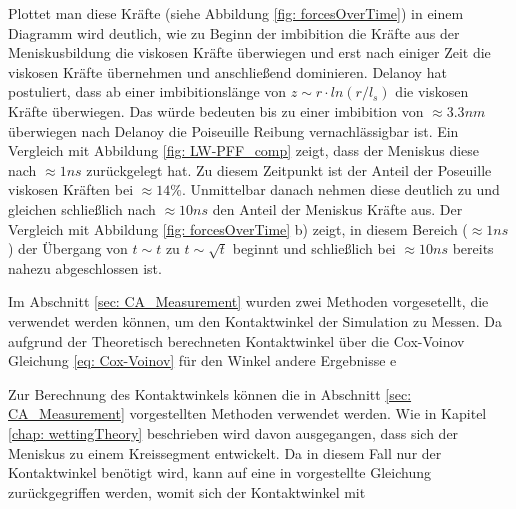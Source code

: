 Plottet man diese Kräfte (siehe  Abbildung \ref*{fig: forcesOverTime}) in einem Diagramm wird deutlich, wie zu Beginn der imbibition die Kräfte aus der Meniskusbildung die viskosen Kräfte überwiegen und erst nach einiger Zeit die viskosen Kräfte übernehmen und anschließend dominieren. Delanoy hat postuliert, dass ab einer imbibitionslänge von $z \sim r\cdot ln(r/l_s)$ die viskosen Kräfte überwiegen. Das würde bedeuten bis zu einer imbibition von $\approx 3.3nm$ überwiegen nach Delanoy die Poiseuille Reibung vernachlässigbar ist. Ein Vergleich mit Abbildung \ref*{fig: LW-PFF_comp} zeigt, dass der Meniskus diese nach $\approx 1ns$ zurückgelegt hat. Zu diesem Zeitpunkt ist der Anteil der Poseuille viskosen Kräften bei $\approx 14\%$. Unmittelbar danach nehmen diese deutlich zu und gleichen schließlich nach $\approx 10ns$ den Anteil der Meniskus Kräfte aus. Der Vergleich mit Abbildung \ref*{fig: forcesOverTime} b) zeigt, in diesem Bereich ($\approx 1ns$) der Übergang von $t\sim t$ zu $t\sim \sqrt{t}$ beginnt und schließlich bei $\approx 10ns$ bereits nahezu abgeschlossen ist.



Im Abschnitt \ref{sec: CA_Measurement} wurden zwei Methoden vorgesetellt, die verwendet werden können, um den Kontaktwinkel der Simulation zu Messen. Da aufgrund der Theoretisch berechneten Kontaktwinkel über die Cox-Voinov Gleichung \ref*{eq: Cox-Voinov} für den Winkel andere Ergebnisse e

Zur Berechnung des Kontaktwinkels können die in Abschnitt \ref*{sec: CA_Measurement} vorgestellten Methoden verwendet werden. Wie in Kapitel \ref*{chap: wettingTheory} beschrieben wird davon ausgegangen, dass sich der Meniskus zu einem Kreissegment entwickelt. Da in diesem Fall nur der Kontaktwinkel benötigt wird, kann auf eine in \cite{buttPhysicsChemistryInterfaces} vorgestellte Gleichung zurückgegriffen werden, womit sich der Kontaktwinkel mit 

